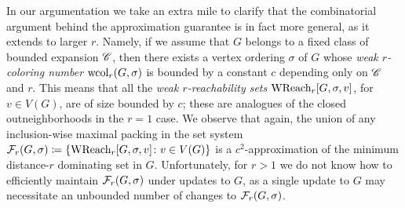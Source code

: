 In our argumentation we take an extra mile to clarify that the combinatorial argument behind the approximation guarantee is in fact more general, as it extends to larger $r$. Namely, if we assume that $G$ belongs to a fixed class of bounded expansion $\mathscr C$, then there exists a vertex ordering $\sigma$ of $G$ whose \emph{weak $r$-coloring number} $\textrm{wcol}_r(G,\sigma)$ is bounded by a constant $c$ depending only on $\mathscr C$ and $r$. This means that all the \emph{weak $r$-reachability sets} $\textrm{WReach}_r[G,\sigma,v]$, for $v\in V(G)$, are of size bounded by $c$; these are analogues of the closed outneighborhoods in the $r=1$ case. We observe that again, the union of any inclusion-wise maximal packing in the set system $\mathcal{F}_r(G,\sigma)\coloneqq \{\textrm{WReach}_r[G,\sigma,v]\colon v\in V(G)\}$ is a $c^2$-approximation of the minimum distance-$r$ dominating set in $G$. Unfortunately, for $r>1$ we do not know how to efficiently maintain $\mathcal{F}_r(G,\sigma)$ under updates to $G$, as a single update to $G$ may necessitate an unbounded number of changes to $\mathcal{F}_r(G,\sigma)$.
